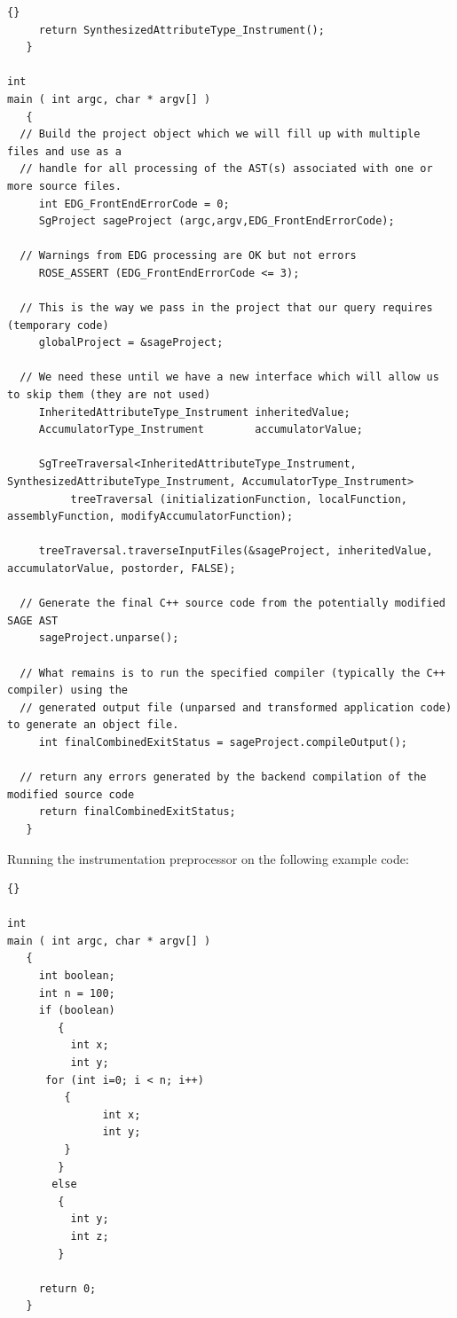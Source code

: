 \documentclass[10pt]{article}
\begin{document}
\begin{lstlisting}{}
     return SynthesizedAttributeType_Instrument();
   }

int
main ( int argc, char * argv[] )
   {
  // Build the project object which we will fill up with multiple files and use as a
  // handle for all processing of the AST(s) associated with one or more source files.
     int EDG_FrontEndErrorCode = 0;
     SgProject sageProject (argc,argv,EDG_FrontEndErrorCode);

  // Warnings from EDG processing are OK but not errors
     ROSE_ASSERT (EDG_FrontEndErrorCode <= 3);

  // This is the way we pass in the project that our query requires (temporary code)
     globalProject = &sageProject;

  // We need these until we have a new interface which will allow us to skip them (they are not used)
     InheritedAttributeType_Instrument inheritedValue;
     AccumulatorType_Instrument        accumulatorValue;

     SgTreeTraversal<InheritedAttributeType_Instrument, SynthesizedAttributeType_Instrument, AccumulatorType_Instrument>
          treeTraversal (initializationFunction, localFunction, assemblyFunction, modifyAccumulatorFunction);

     treeTraversal.traverseInputFiles(&sageProject, inheritedValue, accumulatorValue, postorder, FALSE);

  // Generate the final C++ source code from the potentially modified SAGE AST
     sageProject.unparse();

  // What remains is to run the specified compiler (typically the C++ compiler) using the
  // generated output file (unparsed and transformed application code) to generate an object file.
     int finalCombinedExitStatus = sageProject.compileOutput();

  // return any errors generated by the backend compilation of the modified source code
     return finalCombinedExitStatus;
   }

\end{lstlisting}

\vspace{0.5in}

   Running the instrumentation preprocessor on the following example code:

\begin{lstlisting}{}

int
main ( int argc, char * argv[] )
   {
     int boolean;
     int n = 100;
     if (boolean)
        {
          int x;
          int y;
	  for (int i=0; i < n; i++)
	     {
               int x;
               int y;
	     }
        }
       else
        {
          int y;
          int z;
        }
     
     return 0;
   }

\end{lstlisting}
\end{document}
